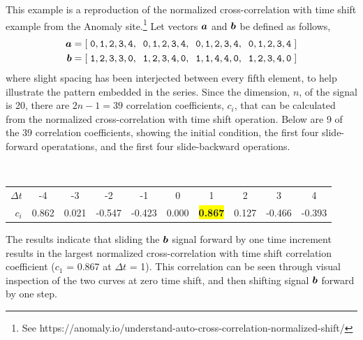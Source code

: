 \begin{Hexample}
	{
    This example is a reproduction of the normalized cross-correlation with
    time shift example from the Anomaly site.\footnote{See 
https://anomaly.io/understand-auto-cross-correlation-normalized-shift/}
	Let vectors $\mbox{\boldmath $a$}$ and $\mbox{\boldmath $b$}$ be defined as follows,
	\begin{align}
		\mbox{\boldmath $a$} &= {\tt [\; 0, 1, 2, 3, 4, \;\; 0, 1, 2, 3, 4, \;\; 0, 1, 2, 3, 4, \;\; 0, 1, 2, 3, 4 \; ] } \\
		\mbox{\boldmath $b$} &= {\tt [\; 1, 2, 3, 3, 0, \;\; 1, 2, 3, 4, 0, \;\; 1, 1, 4, 4, 0, \;\; 1, 2, 3, 4, 0 \; ] }
	\end{align}
    where slight spacing has been interjected between every fifth element, to help
    illustrate the pattern embedded in the series.  
    Since the dimension, $n$, of the signal is 20, there are $2 n - 1 = 39$
    correlation coefficients, $c_i$, that can be calculated from the 
    normalized cross-correlation with time shift operation.  Below are
    9 of the 39 correlation coefficients, showing the initial condition, 
    the first four slide-forward operatations, and the first four slide-backward 
    operations.  

    {\tt \footnotesize
    \begin{center}
    \begin{tabular}{rccccccccc}    
       $\Delta t$ & -4 & -3 & -2 & -1 & 0 & 1 & 2 & 3 & 4 \\
       $c_i$ & 0.862 & 0.021 & -0.547 & -0.423 & 0.000 & \colorbox{yellow}{\bf 0.867} & 
       0.127 & -0.466 & -0.393 
    \end{tabular}
    \end{center}
    }
    The results indicate that sliding the $\mbox{\boldmath $b$}$ signal forward by one time
    increment results in the largest normalized cross-correlation with time
    shift correlation coefficient ($c_1$ = 0.867 at $\Delta t$ = 1).  
    This correlation can be seen through visual
    inspection of the two curves at zero time shift, and then shifting 
    signal $\mbox{\boldmath $b$}$ forward by one step.
	}
\end{Hexample}


